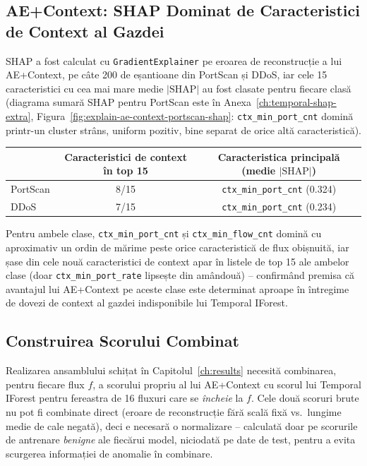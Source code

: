 \subsection{AE+Context: SHAP Dominat de Caracteristici de Context al Gazdei}

SHAP a fost calculat cu \texttt{GradientExplainer} pe eroarea de reconstrucție a lui AE+Context, pe câte 200 de eșantioane din PortScan și DDoS, iar cele 15 caracteristici cu cea mai mare medie $|\text{SHAP}|$ au fost clasate pentru fiecare clasă (diagrama sumară SHAP pentru PortScan este în Anexa~\ref{ch:temporal-shap-extra}, Figura~\ref{fig:explain-ae-context-portscan-shap}: \texttt{ctx\_min\_port\_cnt} domină printr-un cluster strâns, uniform pozitiv, bine separat de orice altă caracteristică).

\begin{center}
\begin{tabular}{@{}lcc@{}}
\toprule
 & Caracteristici de context în top 15 & Caracteristica principală (medie $|\text{SHAP}|$) \\
\midrule
PortScan & 8/15 & \texttt{ctx\_min\_port\_cnt} (0.324) \\
DDoS     & 7/15 & \texttt{ctx\_min\_port\_cnt} (0.234) \\
\bottomrule
\end{tabular}
\end{center}

Pentru ambele clase, \texttt{ctx\_min\_port\_cnt} și \texttt{ctx\_min\_flow\_cnt} domină cu aproximativ un ordin de mărime peste orice caracteristică de flux obișnuită, iar șase din cele nouă caracteristici de context apar în listele de top 15 ale ambelor clase (doar \texttt{ctx\_min\_port\_rate} lipsește din amândouă) -- confirmând premisa că avantajul lui AE+Context pe aceste clase este determinat aproape în întregime de dovezi de context al gazdei indisponibile lui Temporal IForest.



\subsection{Construirea Scorului Combinat}
\label{sec:explain-ensemble-build}

Realizarea ansamblului schițat în Capitolul~\ref{ch:results} necesită combinarea, pentru fiecare flux $f$, a scorului propriu al lui AE+Context cu scorul lui Temporal IForest pentru fereastra de 16 fluxuri care se \emph{încheie} la $f$. Cele două scoruri brute nu pot fi combinate direct (eroare de reconstrucție fără scală fixă vs.\ lungime medie de cale negată), deci e necesară o normalizare -- calculată doar pe scorurile de antrenare \emph{benigne} ale fiecărui model, niciodată pe date de test, pentru a evita scurgerea informației de anomalie în combinare.

